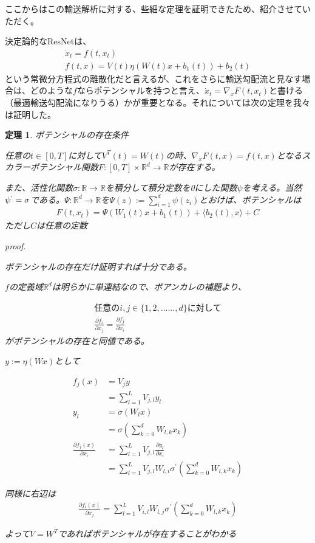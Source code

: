 \documentclass{jsarticle}
\newtheorem{theo}{定理}[section]
\begin{document}
ここからはこの輸送解析に対する、些細な定理を証明できたため、紹介させていただく。

決定論的なResNetは、
\begin{align}
\dot{x}_t=f(t,x_t)\\
f(t,x)=V(t)\eta(W(t)x+b_1(t))+b_2(t)
\end{align}
という常微分方程式の離散化だと言えるが、これをさらに輸送勾配流と見なす場合は、どのような$f$ならポテンシャルを持つと言え、$\dot{x}_t=\nabla_xF(t,x_t)$と書ける（最適輸送勾配流になりうる）かが重要となる。それについては次の定理を我々は証明した。



\begin{theo} ポテンシャルの存在条件

任意の$t\in[0,T]$に対して$V^T(t)=W(t)$の時、$\nabla_xF(t,x)=f(t,x)$となるスカラーポテンシャル関数$F:[0,T]\times \mathbb{R}^d\to\mathbb{R}$が存在する。


また、活性化関数$\sigma:\mathbb{R}\to\mathbb{R}$を積分して積分定数を0にした関数$\psi$を考える。当然$\psi^`=\sigma$である。$\Psi:\mathbb{R}^d\to\mathbb{R}$を$\Psi(z):=\sum^d_{i=1}\psi(z_i)$とおけば、ポテンシャルは
\begin{align}
F(t,x_t)=\Psi(W_1(t)x+b_1(t))+\langle b_2(t),x\rangle+C
\end{align}
ただし$C$は任意の定数

proof.

ポテンシャルの存在だけ証明すれば十分である。

$f$の定義域$\mathbb{R}^d$は明らかに単連結なので、ポアンカレの補題より、

\begin{align}
任意のi,j\in\{1,2,......,d\}に対して \nonumber\\
\frac{\partial f_i}{\partial x_j}=\frac{\partial f_j}{\partial x_i}
\end{align}
がポテンシャルの存在と同値である。

$y:=\eta(Wx)$として

\begin{align}
f_j(x)&=V_jy\\
&=\sum^L_{l=1} V_{j,l}y_l\\
y_l&=\sigma(W_l x)\\
&=\sigma(\sum^d_{k=0}W_{l,k} x_k)\\
\frac{\partial f_j(x)}{\partial x_i}&=\sum^L_{l=1}V_{j,l}\frac{\partial y_l}{\partial x_i}\\
&=\sum^L_{l=1}V_{j,l}W_{l,i}\sigma^{'}(\sum^d_{k=0}W_{l,k} x_k)
\end{align}

同様に右辺は
\begin{align}
\frac{\partial f_i(x)}{\partial x_j}=\sum^L_{l=1}V_{i,l}W_{l,j}\sigma^{'}(\sum^d_{k=0}W_{l,k} x_k)
\end{align}

よって$V=W^T$であればポテンシャルが存在することがわかる

\end{theo}
\end{document}
